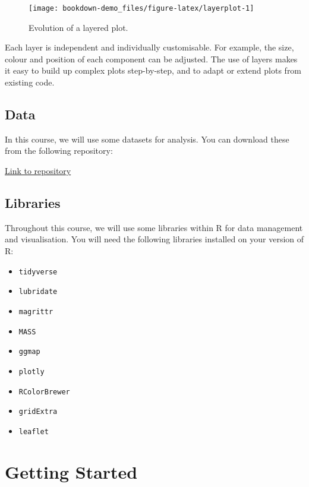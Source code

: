 \documentclass[
]{book}
\providecommand{\tightlist}{%
  \setlength{\itemsep}{0pt}\setlength{\parskip}{0pt}}
\begin{document}
\begin{figure}[h]

{\centering \texttt{[image: bookdown-demo\_files/figure-latex/layerplot-1]} 

}

\caption{\label{fig:layer} Evolution of a layered plot.}\label{fig:layerplot}
\end{figure}

Each layer is independent and individually customisable. For example, the size, colour and position of each component can be adjusted. The use of layers makes it easy to build up complex plots step-by-step, and to adapt or extend plots from existing code.

\hypertarget{data}{%
\section{Data}\label{data}}

In this course, we will use some datasets for analysis. You can download these from the following repository:

\href{https://github.com/craigalexander/IntroToRDataVis/tree/main/Data}{Link to repository}

\hypertarget{libraries}{%
\section{Libraries}\label{libraries}}

Throughout this course, we will use some libraries within R for data management and visualisation. You will need the following libraries installed on your version of R:

\begin{itemize}
\tightlist
\item
  \texttt{tidyverse}
\item
  \texttt{lubridate}
\item
  \texttt{magrittr}
\item
  \texttt{MASS}
\item
  \texttt{ggmap}
\item
  \texttt{plotly}
\item
  \texttt{RColorBrewer}
\item
  \texttt{gridExtra}
\item
  \texttt{leaflet}
\end{itemize}

\hypertarget{intro}{%
\chapter{Getting Started}\label{intro}}
\end{document}
